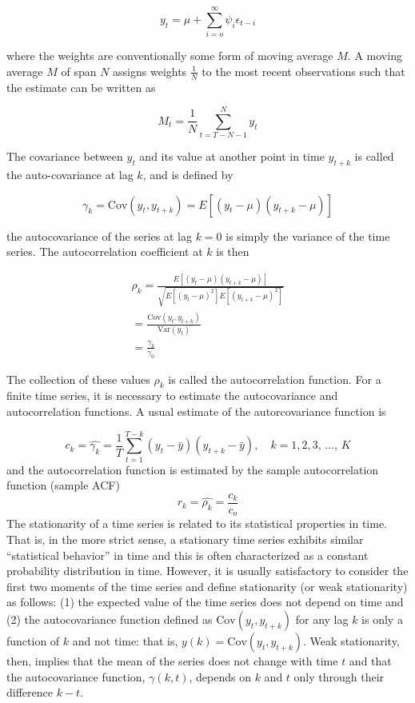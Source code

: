 \documentclass[
  11pt,
]{article}
\begin{document}
\[
y_{t} = \mu + \sum\limits_{i= o}^{\infty}\psi_{i}\epsilon_{t-i}
\]

where the weights are conventionally some form of moving average \(M\).
A moving average \(M\) of span \(N\) assigns weights \(\frac{1}{N}\) to
the most recent observations such that the estimate can be written as

\[
M_{t} = \frac{1}{N} \sum\limits_{t = T - N - 1}^{N} y_{t}
\]

The covariance between \(y_{t}\) and its value at another point in time
\(y_{t + k}\) is called the auto-covariance at lag \(k\), and is defined
by

\[
\gamma_{k} = \mathrm{Cov}(y_{t}, y_{t+k}) = E\left[(y_{t} - \mu)(y_{t+k} - \mu)\right]
\]

the autocovariance of the series at lag \(k = 0\) is simply the variance
of the time series. The autocorrelation coefficient at \(k\) is then

\begin{gather*}
\rho_{k} = \frac{E[(y_{t} - \mu)(y_{t+k} -\mu)]}{\sqrt{E[(y_{t} - \mu)^{2}]E[(y_{t+k} - \mu)^{2}]}} \\[8pt]
= \frac{\mathrm{Cov}(y_{t}, y_{t+k})}{\mathrm{Var}(y_{t})}\\[8pt]
= \frac{\gamma_{k}}{\gamma_{0}}
\end{gather*}

The collection of these values \(\rho_{k}\) is called the
autocorrelation function. For a finite time series, it is necessary to
estimate the autocovariance and autocorrelation functions. A usual
estimate of the autorcovariance function is

\[
c_{k} = \hat{\gamma_{k}} = \frac{1}{T} \sum\limits_{t = 1}^{T-k}(y_{t} -\bar{y})(y_{t+k} - \bar{y}), \quad k = 1, 2, 3,\, \ldots,\, K
\] and the autocorrelation function is estimated by the sample
autocorrelation function (sample ACF) \[
r_{k} = \hat{\rho_{k}} = \frac{c_{k}}{c_{o}}
\] The stationarity of a time series is related to its statistical
properties in time. That is, in the more strict sense, a stationary time
series exhibits similar ``statistical behavior'' in time and this is
often characterized as a constant probability distribution in time.
However, it is usually satisfactory to consider the first two moments of
the time series and define stationarity (or weak stationarity) as
follows: (1) the expected value of the time series does not depend on
time and (2) the autocovariance function defined as
\(\mathrm{Cov}(y_{t}, y_{t+k})\) for any lag \(k\) is only a function of
\(k\) and not time: that is, \(y(k) = \mathrm{Cov}(y_{t}, y_{t+k})\).
Weak stationarity, then, implies that the mean of the series does not
change with time \(t\) and that the autocovariance function,
\(\gamma(k, t)\), depends on \(k\) and \(t\) only through their
difference \(k - t\).
\end{document}
